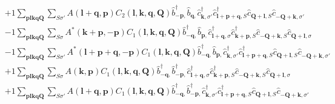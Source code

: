 \begin{align*}
	&+1 \sum_{ \mathbf{p} \mathbf{l} \mathbf{k} \mathbf{q} \mathbf{Q} } \sum_{ S \sigma' } A( \mathbf{l}+\mathbf{q}, \mathbf{p} )  C_2( \mathbf{l}, \mathbf{k}, \mathbf{q}, \mathbf{Q} )   \hat{b}_{ -\mathbf{p}, }^\dagger  \hat{b}_{ \mathbf{q}, }^{\phantom{\dagger}} \hat{c}_{ \mathbf{k}, \sigma' }^\dagger  \hat{c}_{ \mathbf{l}+\mathbf{p}+\mathbf{q}, S }^\dagger  \hat{c}_{ \mathbf{Q}+\mathbf{l}, S }^{\phantom{\dagger}} \hat{c}_{ -\mathbf{Q}+\mathbf{k}, \sigma' }^{\phantom{\dagger}}  \\
	&-1 \sum_{ \mathbf{p} \mathbf{l} \mathbf{k} \mathbf{q} \mathbf{Q} } \sum_{ S \sigma } A^*( \mathbf{k}+\mathbf{p}, -\mathbf{p} )  C_1( \mathbf{l}, \mathbf{k}, \mathbf{q}, \mathbf{Q} )   \hat{b}_{ -\mathbf{q}, }^\dagger  \hat{b}_{ \mathbf{p}, }^{\phantom{\dagger}} \hat{c}_{ \mathbf{l}+\mathbf{q}, \sigma }^\dagger  \hat{c}_{ \mathbf{k}+\mathbf{p}, S }^\dagger  \hat{c}_{ -\mathbf{Q}+\mathbf{k}, S }^{\phantom{\dagger}} \hat{c}_{ \mathbf{Q}+\mathbf{l}, \sigma }^{\phantom{\dagger}}  \\
	&-1 \sum_{ \mathbf{p} \mathbf{l} \mathbf{k} \mathbf{q} \mathbf{Q} } \sum_{ S \sigma' } A^*( \mathbf{l}+\mathbf{p}+\mathbf{q}, -\mathbf{p} )  C_1( \mathbf{l}, \mathbf{k}, \mathbf{q}, \mathbf{Q} )   \hat{b}_{ -\mathbf{q}, }^\dagger  \hat{b}_{ \mathbf{p}, }^{\phantom{\dagger}} \hat{c}_{ \mathbf{k}, \sigma' }^\dagger  \hat{c}_{ \mathbf{l}+\mathbf{p}+\mathbf{q}, S }^\dagger  \hat{c}_{ \mathbf{Q}+\mathbf{l}, S }^{\phantom{\dagger}} \hat{c}_{ -\mathbf{Q}+\mathbf{k}, \sigma' }^{\phantom{\dagger}}  \\
	&+1 \sum_{ \mathbf{p} \mathbf{l} \mathbf{k} \mathbf{q} \mathbf{Q} } \sum_{ S \sigma } A( \mathbf{k}, \mathbf{p} )  C_1( \mathbf{l}, \mathbf{k}, \mathbf{q}, \mathbf{Q} )   \hat{b}_{ -\mathbf{q}, }^\dagger  \hat{b}_{ -\mathbf{p}, }^\dagger  \hat{c}_{ \mathbf{l}+\mathbf{q}, \sigma }^\dagger  \hat{c}_{ \mathbf{k}+\mathbf{p}, S }^\dagger  \hat{c}_{ -\mathbf{Q}+\mathbf{k}, S }^{\phantom{\dagger}} \hat{c}_{ \mathbf{Q}+\mathbf{l}, \sigma }^{\phantom{\dagger}}  \\
	&+1 \sum_{ \mathbf{p} \mathbf{l} \mathbf{k} \mathbf{q} \mathbf{Q} } \sum_{ S \sigma' } A( \mathbf{l}+\mathbf{q}, \mathbf{p} )  C_1( \mathbf{l}, \mathbf{k}, \mathbf{q}, \mathbf{Q} )   \hat{b}_{ -\mathbf{q}, }^\dagger  \hat{b}_{ -\mathbf{p}, }^\dagger  \hat{c}_{ \mathbf{k}, \sigma' }^\dagger  \hat{c}_{ \mathbf{l}+\mathbf{p}+\mathbf{q}, S }^\dagger  \hat{c}_{ \mathbf{Q}+\mathbf{l}, S }^{\phantom{\dagger}} \hat{c}_{ -\mathbf{Q}+\mathbf{k}, \sigma' }^{\phantom{\dagger}}  \\

\end{align*}
